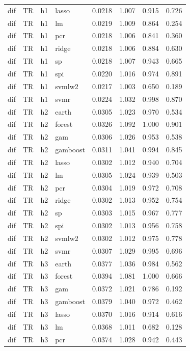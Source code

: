 \begin{ThreePartTable}
\begin{longtable}[t]{llclcccc}
dif & TR & h1 & lasso & 0.0218 & 1.007 & 0.915 & 0.726\\
dif & TR & h1 & lm & 0.0219 & 1.009 & 0.864 & 0.254\\
dif & TR & h1 & pcr & 0.0218 & 1.006 & 0.841 & 0.360\\
dif & TR & h1 & ridge & 0.0218 & 1.006 & 0.884 & 0.630\\
dif & TR & h1 & sp & 0.0218 & 1.007 & 0.943 & 0.665\\
dif & TR & h1 & spi & 0.0220 & 1.016 & 0.974 & 0.891\\
dif & TR & h1 & svmlw2 & 0.0217 & 1.003 & 0.650 & 0.189\\
dif & TR & h1 & svmr & 0.0224 & 1.032 & 0.998 & 0.870\\
\addlinespace
dif & TR & h2 & earth & 0.0305 & 1.023 & 0.970 & 0.534\\
dif & TR & h2 & forest & 0.0326 & 1.092 & 1.000 & 0.901\\
dif & TR & h2 & gam & 0.0306 & 1.026 & 0.953 & 0.538\\
dif & TR & h2 & gamboost & 0.0311 & 1.041 & 0.994 & 0.845\\
dif & TR & h2 & lasso & 0.0302 & 1.012 & 0.940 & 0.704\\
dif & TR & h2 & lm & 0.0305 & 1.024 & 0.939 & 0.503\\
dif & TR & h2 & pcr & 0.0304 & 1.019 & 0.972 & 0.708\\
dif & TR & h2 & ridge & 0.0302 & 1.013 & 0.952 & 0.754\\
dif & TR & h2 & sp & 0.0303 & 1.015 & 0.967 & 0.777\\
dif & TR & h2 & spi & 0.0302 & 1.013 & 0.956 & 0.758\\
dif & TR & h2 & svmlw2 & 0.0302 & 1.012 & 0.975 & 0.778\\
dif & TR & h2 & svmr & 0.0307 & 1.029 & 0.995 & 0.696\\
\addlinespace
dif & TR & h3 & earth & 0.0377 & 1.036 & 0.984 & 0.562\\
dif & TR & h3 & forest & 0.0394 & 1.081 & 1.000 & 0.666\\
dif & TR & h3 & gam & 0.0372 & 1.021 & 0.786 & 0.192\\
dif & TR & h3 & gamboost & 0.0379 & 1.040 & 0.972 & 0.462\\
dif & TR & h3 & lasso & 0.0370 & 1.016 & 0.914 & 0.616\\
dif & TR & h3 & lm & 0.0368 & 1.011 & 0.682 & 0.128\\
dif & TR & h3 & pcr & 0.0374 & 1.028 & 0.942 & 0.443\\

\end{longtable}
\end{ThreePartTable}
